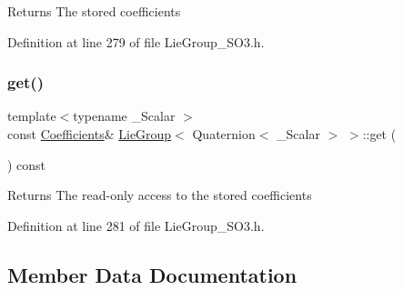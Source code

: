 \begin{DoxyReturn}{Returns}
The stored coefficients 
\end{DoxyReturn}


Definition at line 279 of file Lie\+Group\+\_\+\+S\+O3.\+h.

\hypertarget{class_lie_group_3_01_quaternion_3_01___scalar_01_4_01_4_a81591117317bb7817883ce137bae5ec3}{}\label{class_lie_group_3_01_quaternion_3_01___scalar_01_4_01_4_a81591117317bb7817883ce137bae5ec3} 
\subsubsection{\texorpdfstring{get()}{get()}\hspace{0.1cm}{\footnotesize\ttfamily [2/2]}}
{\footnotesize\ttfamily template$<$typename \+\_\+\+Scalar $>$ \\
const \hyperlink{class_lie_group_3_01_quaternion_3_01___scalar_01_4_01_4_a80504cfb3bcbf55c7d4c1e377ef9f782}{Coefficients}\& \hyperlink{class_lie_group}{Lie\+Group}$<$ Quaternion$<$ \+\_\+\+Scalar $>$ $>$\+::get (\begin{DoxyParamCaption}{ }\end{DoxyParamCaption}) const\hspace{0.3cm}{\ttfamily [inline]}}

\begin{DoxyReturn}{Returns}
The read-\/only access to the stored coefficients 
\end{DoxyReturn}


Definition at line 281 of file Lie\+Group\+\_\+\+S\+O3.\+h.



\subsection{Member Data Documentation}
\hypertarget{class_lie_group_3_01_quaternion_3_01___scalar_01_4_01_4_a8bf670b6608a4fa3139244167131925f}{}\label{class_lie_group_3_01_quaternion_3_01___scalar_01_4_01_4_a8bf670b6608a4fa3139244167131925f} 
